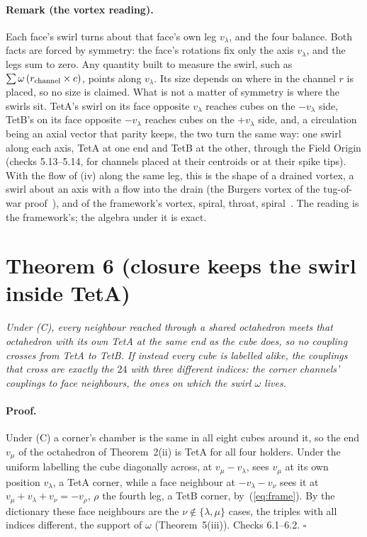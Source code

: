 \documentclass[twocolumn]{iopjournal}
\begin{document}

\paragraph{Remark (the vortex reading).} Each face's swirl turns about
that face's own leg $v_\lambda$, and the four balance. Both facts are
forced by symmetry: the face's rotations fix only the axis
$v_\lambda$, and the legs sum to zero. Any quantity built to measure
the swirl, such as $\sum \omega\,(r_{\rm channel} \times c)$, points
along $v_\lambda$. Its size depends on where in the channel $r$ is
placed, so no size is claimed. What is not a matter of symmetry is
where the swirls sit. TetA's swirl on its face opposite $v_\lambda$
reaches cubes on the $-v_\lambda$ side, TetB's on its face opposite
$-v_\lambda$ reaches cubes on the $+v_\lambda$ side, and, a
circulation being an axial vector that parity keeps, the two turn
the same way: one swirl along each axis, TetA at one end and TetB at
the other, through the Field Origin (checks 5.13--5.14, for channels
placed at their centroids or at their spike tips). With the flow of
(iv) along the same leg, this is the shape of a drained vortex, a
swirl about an axis with a flow into the drain (the Burgers vortex
of the tug-of-war proof~\cite{NelsonTug}), and of the framework's
vortex, spiral, throat, spiral~\cite{NelsonVortex}. The reading is
the framework's; the algebra under it is exact.


\section*{Theorem 6 (closure keeps the swirl inside TetA)}

\emph{Under (C), every neighbour reached through a shared octahedron
meets that octahedron with its own TetA at the same end as the cube
does, so no coupling crosses from TetA to TetB. If instead every cube
is labelled alike, the couplings that cross are exactly the $24$ with
three different indices: the corner channels' couplings to face
neighbours, the ones on which the swirl $\omega$ lives.}

\paragraph{Proof.} Under (C) a corner's chamber is the same in all
eight cubes around it, so the end $v_\mu$ of the octahedron of
Theorem~2(ii) is TetA for all four holders. Under the uniform
labelling the cube diagonally across, at $v_\mu - v_\lambda$, sees
$v_\mu$ at its own position $v_\lambda$, a TetA corner, while a face
neighbour at $-v_\lambda - v_\nu$ sees it at
$v_\mu + v_\lambda + v_\nu = -v_\rho$, $\rho$ the fourth leg, a TetB
corner, by~(\ref{eq:frame}). By the
dictionary these face neighbours are the $\nu \notin \{\lambda,\mu\}$
cases, the triples with all indices different, the support of
$\omega$ (Theorem~5(iii)). Checks 6.1--6.2. \hfill $\square$
\end{document}
